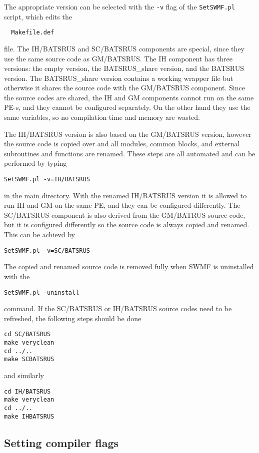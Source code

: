 The appropriate version can be selected with the {\tt -v} flag
of the {\tt SetSWMF.pl} script, which edits the
\begin{verbatim}
  Makefile.def
\end{verbatim}
file. The IH/BATSRUS and SC/BATSRUS components are special, since they use the
same source code as GM/BATSRUS. The IH component has three versions: 
the empty version, the BATSRUS\_share version, and the BATSRUS version. 
The BATSRUS\_share version contains a working wrapper file but otherwise 
it shares the source code
with the GM/BATSRUS component. Since the source codes are shared, the
IH and GM components cannot run on the same PE-s, and they cannot be
configured separately. On the other hand they use the same variables,
so no compilation time and memory are wasted.

The IH/BATSRUS version is also based on the GM/BATSRUS version, however
the source code is copied over and all modules, common blocks,
and external subroutines and functions are renamed. 
These steps are all automated and can be performed by typing
\begin{verbatim}
SetSWMF.pl -v=IH/BATSRUS
\end{verbatim}
in the main directory. With the renamed IH/BATSRUS version it is allowed 
to run IH and GM on the same PE, and they can be configured differently.
The SC/BATSRUS component is also derived from the GM/BATRUS source code,
but it is configured differently so the source code is always copied
and renamed. This can be achievd by
\begin{verbatim}
SetSWMF.pl -v=SC/BATSRUS
\end{verbatim}
The copied and renamed source code is removed fully when SWMF is
uninstalled with the
\begin{verbatim}
SetSWMF.pl -uninstall
\end{verbatim}
command. If the SC/BATSRUS or IH/BATSRUS source codes need to be
refreshed, the following steps should be done
\begin{verbatim}
cd SC/BATSRUS
make veryclean
cd ../..
make SCBATSRUS
\end{verbatim}
and similarly
\begin{verbatim}
cd IH/BATSRUS
make veryclean
cd ../..
make IHBATSRUS
\end{verbatim}

\subsection{Setting compiler flags}

